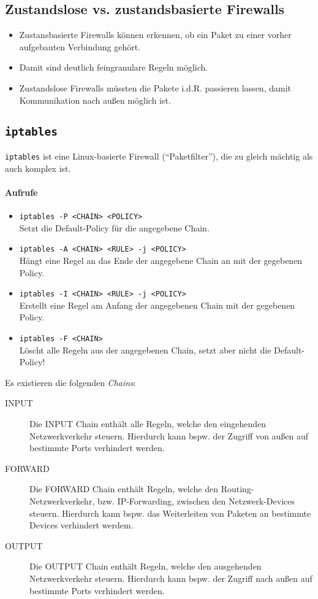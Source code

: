 	\subsection{Zustandslose vs. zustandsbasierte Firewalls}
		\begin{itemize}
			\item Zustansbasierte Firewalls können erkennen, ob ein Paket zu einer vorher aufgebauten Verbindung gehört.
			\item Damit sind deutlich feingranulare Regeln möglich.
			\item Zustandslose Firewalls müssten die Pakete i.d.R. passieren lassen, damit Kommunikation nach außen möglich ist.
		\end{itemize}

	\subsection{\texttt{iptables}}
		\texttt{iptables} ist eine Linux-basierte Firewall (\enquote{Paketfilter}), die zu gleich mächtig als auch komplex ist.

		\paragraph{Aufrufe}
			\begin{itemize}
				\item \texttt{iptables -P <CHAIN> <POLICY>} \\ Setzt die Default-Policy für die angegebene Chain.
				\item \texttt{iptables -A <CHAIN> <RULE> -j <POLICY>} \\ Hängt eine Regel an das Ende der angegebene Chain an mit der gegebenen Policy.
				\item \texttt{iptables -I <CHAIN> <RULE> -j <POLICY>} \\ Erstellt eine Regel am Anfang der angegebenen Chain mit der gegebenen Policy.
				\item \texttt{iptables -F <CHAIN>} \\ Löscht alle Regeln aus der angegebenen Chain, setzt aber nicht die Default-Policy!
			\end{itemize}

			Es existieren die folgenden \textit{Chains}:
			\begin{description}
				\item[INPUT]   Die INPUT Chain enthält alle Regeln, welche den eingehenden Netzwerkverkehr steuern. Hierdurch kann bspw. der Zugriff von außen auf bestimmte Ports verhindert werden.
				\item[FORWARD] Die FORWARD Chain enthält Regeln, welche den Routing-Netzwerkverkehr, bzw. IP-Forwarding, zwischen den Netzwerk-Devices steuern. Hierdurch kann bspw. das Weiterleiten von Paketen an bestimmte Devices verhindert werdem.
				\item[OUTPUT]  Die OUTPUT Chain enthält Regeln, welche den ausgehenden Netzwerkverkehr steuern. Hierdurch kann bspw. der Zugriff nach außen auf bestimmte Ports verhindert werden.
			\end{description}

